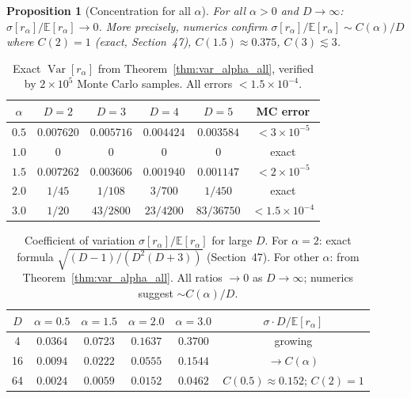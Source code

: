 \documentclass[12pt,a4paper]{article}
\newtheorem{proposition}[theorem]{Proposition}
\begin{document}
\begin{proposition}[Concentration for all $\alpha$]
\label{prop:conc_alpha}
For all $\alpha>0$ and $D\to\infty$:
$\sigma[r_\alpha]/\mathbb{E}[r_\alpha]\to0$.
More precisely, numerics confirm $\sigma[r_\alpha]/\mathbb{E}[r_\alpha]\sim C(\alpha)/D$
where $C(2)=1$ (exact, Section~47), $C(1.5)\approx0.375$, $C(3)\lesssim3$.
\end{proposition}

\begin{table}[h!]
\centering
\caption{Exact $\operatorname{Var}[r_\alpha]$ from Theorem~\ref{thm:var_alpha_all},
verified by $2\times10^5$ Monte Carlo samples.
All errors $<1.5\times10^{-4}$.}
\label{tab:var_alpha}
\begin{tabular}{c|c|c|c|c|c}
$\alpha$ & $D=2$ & $D=3$ & $D=4$ & $D=5$ & MC error \\
\hline
$0.5$ & $0.007620$ & $0.005716$ & $0.004424$ & $0.003584$ & $<3\times10^{-5}$ \\
$1.0$ & $0$ & $0$ & $0$ & $0$ & exact \\
$1.5$ & $0.007262$ & $0.003606$ & $0.001940$ & $0.001147$ & $<2\times10^{-5}$ \\
$2.0$ & $1/45$ & $1/108$ & $3/700$ & $1/450$ & exact \\
$3.0$ & $1/20$ & $43/2800$ & $23/4200$ & $83/36750$ & $<1.5\times10^{-4}$ \\
\end{tabular}
\end{table}

\begin{table}[h!]
\centering
\caption{Coefficient of variation $\sigma[r_\alpha]/\mathbb{E}[r_\alpha]$ for large $D$.
For $\alpha=2$: exact formula $\sqrt{(D-1)/(D^2(D+3))}$ (Section~47).
For other $\alpha$: from Theorem~\ref{thm:var_alpha_all}.
All ratios $\to0$ as $D\to\infty$; numerics suggest $\sim C(\alpha)/D$.}
\label{tab:cov_alpha}
\begin{tabular}{c|c|c|c|c|c}
$D$ & $\alpha=0.5$ & $\alpha=1.5$ & $\alpha=2.0$ & $\alpha=3.0$ & $\sigma\cdot D/\mathbb{E}[r_\alpha]$\\
\hline
4   & $0.0364$ & $0.0723$ & $0.1637$ & $0.3700$ & growing \\
16  & $0.0094$ & $0.0222$ & $0.0555$ & $0.1544$ & $\to C(\alpha)$ \\
64  & $0.0024$ & $0.0059$ & $0.0152$ & $0.0462$ & $C(0.5)\approx0.152$; $C(2)=1$\\
\end{tabular}
\end{table}
\end{document}
